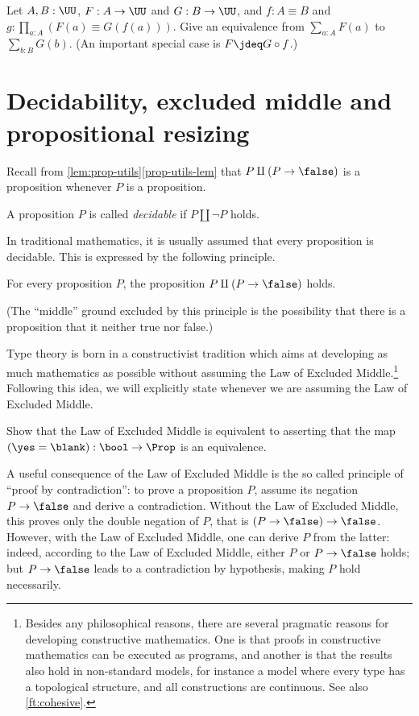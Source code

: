 \begin{xca}\label{xca:sum-equivalences}
Let $A,B:\UU$, $F:A\to\UU$ and $G:B\to\UU$,
and $f: A\equiv B$ and $g:\prod_{a:A}(F(a) \equiv G(f(a)))$.
Give an equivalence from $\sum_{a:A} F(a)$ to $\sum_{b:B} G(b)$.
(An important special case is $F\jdeq G\circ f$.)
\end{xca}


\section{Decidability, excluded middle and propositional resizing}
\label{sec:decidability}

Recall from \cref{lem:prop-utils}\ref{prop-utils-lem} that $P\amalg (P \to
\false)$ is a proposition whenever $P$ is a proposition.
\begin{definition}\label{def:decidability}
  A proposition $P$ is called \emph{decidable}
  if $P\amalg\neg P$ holds.
\end{definition}
In traditional mathematics, it is usually assumed that
every proposition is decidable.
This is expressed by the following principle.
\begin{principle}
  \label{pri:lem}%
  For every proposition $P$, the proposition $P\amalg (P\to \false)$ holds.
\end{principle}

(The ``middle'' ground excluded by this principle is the possibility that there
is a proposition that it neither true nor false.)

Type theory is born
in a constructivist tradition
which aims at developing as much mathematics as
possible without assuming the Law of Excluded Middle.\footnote{%
  Besides any philosophical reasons,
  there are several pragmatic reasons
  for developing constructive mathematics.
  One is that proofs in constructive mathematics
  can be executed as programs,
  and another is that the results also hold in non-standard models,
  for instance a model where every type has a topological structure,
  and all constructions are continuous.
  See also \cref{ft:cohesive}.}
Following this idea, we will
explicitly state whenever we are assuming the Law of Excluded Middle.
\begin{xca}\label{xca:lem-prop}
  Show that the Law of Excluded Middle is equivalent to asserting
  that the map $(\yes = \blank) : \bool \to \Prop$
  is an equivalence.
\end{xca}
A useful consequence of the Law of Excluded Middle is the so called principle of ``proof by
contradiction'': to prove a proposition $P$, assume its negation $P\to\false$
and derive a contradiction. Without the Law of Excluded Middle, this proves only the double negation of
$P$, that is $(P\to\false)\to\false$.  However, with the Law of Excluded Middle, one can derive $P$
from the latter: indeed, according to the Law of Excluded Middle, either $P$ or $P\to \false$ holds;
but $P\to\false$ leads to a contradiction by hypothesis, making $P$ hold
necessarily.

